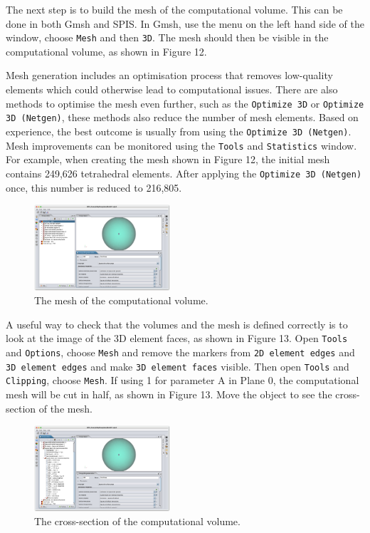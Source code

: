 \documentclass[a4paper, 11pt]{article}
\begin{document}
The next step is to build the mesh of the computational volume. This can be done in both Gmsh and SPIS. In Gmsh, use the menu on the left hand side of the window, choose \verb|Mesh| and then \verb|3D|. The mesh should then be visible in the computational volume, as shown in Figure 12.\par
Mesh generation includes an optimisation process that removes low-quality elements which could otherwise lead to computational issues. There are also methods to optimise the mesh even further, such as the \verb|Optimize 3D| or \verb|Optimize 3D (Netgen)|, these methods also reduce the number of mesh elements. Based on experience, the best outcome is usually from using the \verb|Optimize 3D (Netgen)|. Mesh improvements can be monitored using the \verb|Tools| and \verb|Statistics| window. For example, when creating the mesh shown in Figure 12, the initial mesh contains 249,626 tetrahedral elements. After applying the \verb|Optimize 3D (Netgen)| once, this number is reduced to 216,805.

\begin{figure}[!ht]
    \centering
    \includegraphics[width=0.45\textwidth]{fig12.jpg}
    \caption{The mesh of the computational volume.}
\end{figure}

A useful way to check that the volumes and the mesh is defined correctly is to look at the image of the 3D element faces, as shown in Figure 13. Open \verb|Tools| and \verb|Options|, choose \verb|Mesh| and remove the markers from \verb|2D element edges| and \verb|3D element edges| and make \verb|3D element faces| visible. Then open \verb|Tools| and \verb|Clipping|, choose \verb|Mesh|. If using 1 for parameter A in Plane 0, the computational mesh will be cut in half, as shown in Figure 13. Move the object to see the cross-section of the mesh.

\begin{figure}[!ht]
    \centering
    \includegraphics[width=0.45\textwidth]{fig13.jpg}
    \caption{The cross-section of the computational volume.}
\end{figure}
\end{document}
